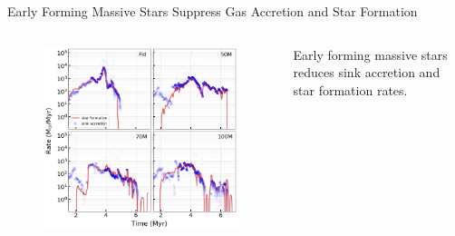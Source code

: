\documentclass[aspectratio=169]{beamer}
\begin{document}
\begin{frame}{Early Forming Massive Stars Suppress Gas Accretion and Star Formation}{}
    \begin{columns}
        \begin{column}{0.42\textwidth}
            \begin{figure}[h!]
                \centering
                \includegraphics[width=\linewidth]{../images/sink_accretion_star_formation_rates.png} \\
                \label{fig:sink_star_rates}
            \end{figure}
        \end{column}
        \begin{column}{0.42\textwidth}
            Early forming massive stars reduces sink accretion and star formation rates.
        \end{column}
    \end{columns}
\end{frame} 
\end{document}
